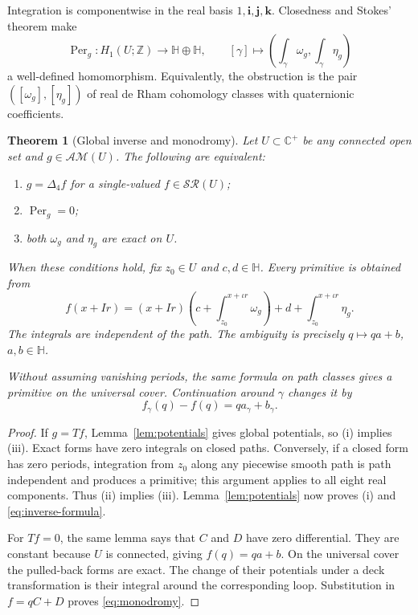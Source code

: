 \documentclass[11pt,a4paper]{article}
\numberwithin{equation}{section}
\newtheorem{theorem}{Theorem}[section]
\theoremstyle{definition}
\theoremstyle{remark}
\newcommand{\C}{\mathbb C}
\newcommand{\HH}{\mathbb H}
\newcommand{\ii}{\mathbf i}
\newcommand{\jj}{\mathbf j}
\newcommand{\kk}{\mathbf k}
\newcommand{\ic}{\iota}
\newcommand{\lap}{\Delta_4}
\newcommand{\SR}{\mathcal{SR}}
\newcommand{\AM}{\mathcal{AM}}
\newcommand{\Per}{\operatorname{Per}}
\begin{document}
Integration is componentwise in the real basis $1,\ii,\jj,\kk$. Closedness
and Stokes' theorem make
\begin{equation}
 \Per_g:H_1(U;\mathbb Z)\longrightarrow\HH\oplus\HH,
 \qquad [\gamma]\longmapsto
 \left(\int_\gamma\omega_g,\int_\gamma\eta_g\right)
 \label{eq:period-map}
\end{equation}
a well-defined homomorphism. Equivalently, the obstruction is the pair
$([\omega_g],[\eta_g])$ of real de Rham cohomology classes with quaternionic
coefficients.

\begin{theorem}[Global inverse and monodromy]\label{thm:period}
Let $U\subset\C^+$ be any connected open set and $g\in\AM(U)$.
The following are equivalent:
\begin{enumerate}[label=\textup{(\roman*)}]
\item $g=\lap f$ for a single-valued $f\in\SR(U)$;
\item $\Per_g=0$;
\item both $\omega_g$ and $\eta_g$ are exact on $U$.
\end{enumerate}
When these conditions hold, fix $z_0\in U$ and $c,d\in\HH$. Every primitive
is obtained from
\begin{equation}
 f(x+Ir)=(x+Ir)\left(c+\int_{z_0}^{x+\ic r}\omega_g\right)
       +d+\int_{z_0}^{x+\ic r}\eta_g.
 \label{eq:inverse-formula}
\end{equation}
The integrals are independent of the path. The ambiguity is precisely
$q\mapsto qa+b$, $a,b\in\HH$.

Without assuming vanishing periods, the same formula on path classes gives a
primitive on the universal cover. Continuation around $\gamma$ changes it by
\begin{equation}
 f_\gamma(q)-f(q)=q a_\gamma+b_\gamma.
 \label{eq:monodromy}
\end{equation}
\end{theorem}
\begin{proof}
If $g=Tf$, Lemma~\ref{lem:potentials} gives global potentials, so (i) implies
(iii). Exact forms have zero integrals on closed paths. Conversely, if a
closed form has zero periods, integration from $z_0$ along any piecewise
smooth path is path independent and produces a primitive; this argument
applies to all eight real components. Thus (ii) implies (iii).
Lemma~\ref{lem:potentials} now proves (i) and \eqref{eq:inverse-formula}.

For $Tf=0$, the same lemma says that $C$ and $D$ have zero differential.
They are constant because $U$ is connected, giving $f(q)=qa+b$.
On the universal cover the pulled-back forms are exact. The change of their
potentials under a deck transformation is their integral around the
corresponding loop. Substitution in $f=qC+D$ proves \eqref{eq:monodromy}.
\end{proof}
\end{document}
